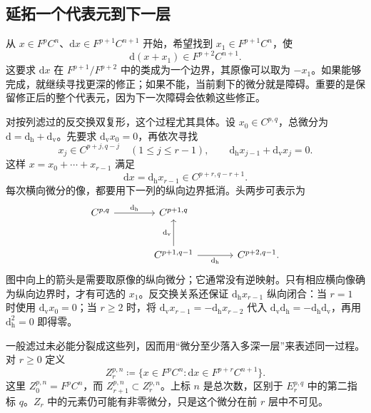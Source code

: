 \subsection{延拓一个代表元到下一层}
\label{g2:subsec:1002:02}

从 \(x\in F^pC^n\)、\(\mathrm dx\in F^{p+1}C^{n+1}\) 开始，希望找到 \(x_1\in F^{p+1}C^n\)，使
\[
	\mathrm d(x+x_1)\in F^{p+2}C^{n+1}.
\]
这要求 \(\mathrm dx\) 在 \(F^{p+1}/F^{p+2}\) 中的类成为一个边界，其原像可以取为 \(-x_1\)。如果能够完成，就继续寻找更深的修正；如果不能，当前剩下的微分就是障碍。重要的是保留修正后的整个代表元，因为下一次障碍会依赖这些修正。

\ProseParagraphBreak

对按列滤过的反交换双复形，这个过程尤其具体。设 \(x_0\in C^{p,q}\)，总微分为 \(\mathrm d=\mathrm d_{\mathrm h}+\mathrm d_{\mathrm v}\)。先要求 \(\mathrm d_{\mathrm v}x_0=0\)，再依次寻找
\[
	x_j\in C^{p+j,q-j}\quad(1\le j\le r-1),\qquad
	\mathrm d_{\mathrm h}x_{j-1}+\mathrm d_{\mathrm v}x_j=0.
\]
这样 \(x=x_0+\cdots+x_{r-1}\) 满足
\begin{equation}\label{g2:eq:spectral-sequence-staircase}
	\mathrm dx=\mathrm d_{\mathrm h}x_{r-1}\in C^{p+r,q-r+1}.
\end{equation}
每次横向微分的像，都要用下一列的纵向边界抵消。头两步可表示为
\[
	\begin{tikzcd}[column sep=large,row sep=large]
		C^{p,q} \arrow[r,"\mathrm d_{\mathrm h}"] & C^{p+1,q} & \\
		& C^{p+1,q-1} \arrow[u,"\mathrm d_{\mathrm v}"] \arrow[r,"\mathrm d_{\mathrm h}"'] & C^{p+2,q-1}.
	\end{tikzcd}
\]
图中向上的箭头是需要取原像的纵向微分；它通常没有逆映射。只有相应横向像确为纵向边界时，才有可选的 \(x_1\)。反交换关系还保证 \(\mathrm d_{\mathrm h}x_{r-1}\) 纵向闭合：当 \(r=1\) 时使用 \(\mathrm d_{\mathrm v}x_0=0\)；当 \(r\ge2\) 时，将 \(\mathrm d_{\mathrm v}x_{r-1}=-\mathrm d_{\mathrm h}x_{r-2}\) 代入 \(\mathrm d_{\mathrm v}\mathrm d_{\mathrm h}=-\mathrm d_{\mathrm h}\mathrm d_{\mathrm v}\)，再用 \(\mathrm d_{\mathrm h}^2=0\) 即得零。

\ProseParagraphBreak

一般滤过未必能分裂成这些列，因而用“微分至少落入多深一层”来表述同一过程。对 \(r\ge0\) 定义
\begin{equation}\label{g2:eq:spectral-sequence-approximate-cocycles}
	Z_r^{p,n}\coloneqq
	\{x\in F^pC^n:\mathrm dx\in F^{p+r}C^{n+1}\}.
\end{equation}
这里 \(Z_0^{p,n}=F^pC^n\)，而 \(Z_{r+1}^{p,n}\subset Z_r^{p,n}\)。上标 \(n\) 是总次数，区别于 \(E_r^{p,q}\) 中的第二指标 \(q\)。\(Z_r\) 中的元素仍可能有非零微分，只是这个微分在前 \(r\) 层中不可见。


